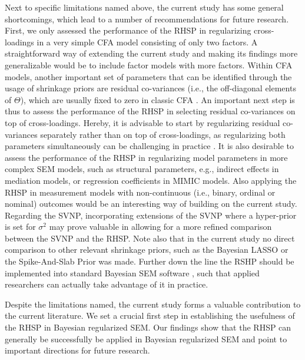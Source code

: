 \documentclass[]{interact}
\theoremstyle{plain}%
\theoremstyle{definition}
\theoremstyle{remark}
\begin{document}
Next to specific limitations named above, the current study has some
general shortcomings, which lead to a number of recommendations for
future research. First, we only assessed the performance of the RHSP in
regularizing cross-loadings in a very simple CFA model consisting of
only two factors. A straightforward way of extending the current study
and making its findings more generalizable would be to include factor
models with more factors. Within CFA models, another important set of
parameters that can be identified through the usage of shrinkage priors
are residual co-variances (i.e., the off-diagonal elements of
\(\Theta\)), which are usually fixed to zero in classic CFA
\citep{muthen_bayesian_2012}. An important next step is thus to assess
the performance of the RHSP in selecting residual co-variances on top of
cross-loadings. Hereby, it is advisable to start by regularizing
residual co-variances separately rather than on top of cross-loadings,
as regularizing both parameters simultaneously can be challenging in
practice \citep{zhang_criteria_2021}. It is also desirable to assess the
performance of the RHSP in regularizing model parameters in more complex
SEM models, such as structural parameters, e.g., indirect effects in
mediation models, or regression coefficients in MIMIC models. Also
applying the RHSP in measurement models with non-continuous (i.e.,
binary, ordinal or nominal) outcomes would be an interesting way of
building on the current study. Regarding the SVNP, incorporating
extensions of the SVNP where a hyper-prior is set for \(\sigma^2\)
\citep[see for instance][]{lu_bayesian_2016} may prove valuable in
allowing for a more refined comparison between the SVNP and the RHSP.
Note also that in the current study no direct comparison to other
relevant shrinkage priors, such as the Bayesian LASSO or the
Spike-And-Slab Prior was made. Further down the line the RSHP should be
implemented into standard Bayesian SEM software \citep[e.g., by adding
it to the BLAVAAN package,][]{merkle_efficient_2020}, such that applied
researchers can actually take advantage of it in practice.

Despite the limitations named, the current study forms a valuable
contribution to the current literature. We set a crucial first step in
establishing the usefulness of the RHSP in Bayesian regularized SEM. Our
findings show that the RHSP can generally be successfully be applied in
Bayesian regularized SEM and point to important directions for future
research.



\end{document}
